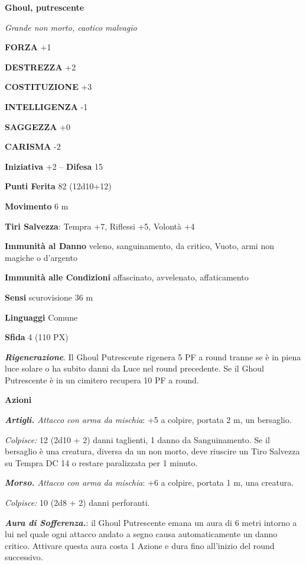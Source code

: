 \begin{multicols}{2}
	\medskip{}\textbf{Ghoul, putrescente}

	\textit{Grande non morto, caotico malvagio}

	\textbf{FORZA} +1

	\textbf{DESTREZZA} +2

	\textbf{COSTITUZIONE} +3

	\textbf{INTELLIGENZA} -1

	\textbf{SAGGEZZA} +0

	\textbf{CARISMA} -2

	\textbf{Iniziativa} +2 -- \textbf{Difesa} 15

	\textbf{Punti Ferita} 82 (12d10+12)

	\textbf{Movimento} 6 m

	\textbf{Tiri Salvezza}: Tempra +7, Riflessi +5, Volontà +4

	\textbf{Immunità al Danno} veleno, sanguinamento, da critico, Vuoto, armi non magiche o d'argento

	\textbf{Immunità alle Condizioni} affascinato, avvelenato, affaticamento

	\textbf{Sensi} scurovisione 36 m

	\textbf{Linguaggi} Comune

	\textbf{Sfida} 4 (110 PX)

	\textbf{\textit{Rigenerazione}}. Il Ghoul Putrescente rigenera 5 PF a round tranne se è in piena luce solare o ha subito danni da Luce nel round precedente. Se il Ghoul Putrescente è in un cimitero recupera 10 PF a round.

	\textbf{Azioni}

	\textit{\textbf{Artigli.} Attacco con arma da mischia}: +5 a colpire, portata 2 m, un bersaglio.

	\textit{Colpisce:} 12 (2d10 + 2) danni taglienti, 1 danno da Sanguinamento. Se il bersaglio è una creatura, diversa da un non morto, deve riuscire un Tiro Salvezza su Tempra DC 14 o restare paralizzata per 1 minuto.

	\textit{\textbf{Morso.} Attacco con arma da mischia}: +6 a colpire, portata 1 m, una creatura.

	\textit{Colpisce:} 10 (2d8 + 2) danni perforanti.

	\textit{\textbf{Aura di Sofferenza.}}: il Ghoul Putrescente emana un aura di 6 metri intorno a lui nel quale ogni attacco andato a segno causa automaticamente un danno critico. Attivare questa aura costa 1 Azione e dura fino all'inizio del round successivo.


\end{multicols}
